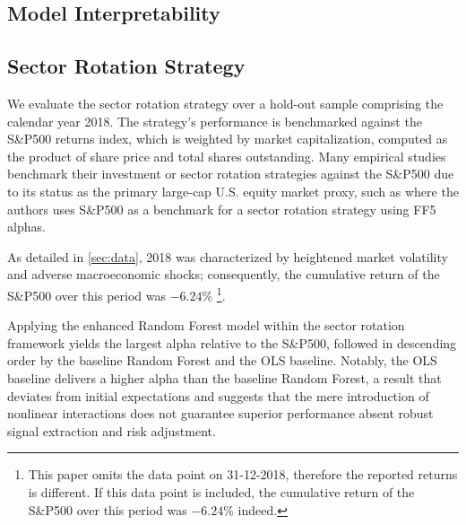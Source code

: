 \subsection{Model Interpretability}
\subsection{Sector Rotation Strategy}

We evaluate the sector rotation strategy over a hold-out sample comprising the calendar year 2018. The strategy's performance is benchmarked against the S\&P500 returns index, which is weighted by market capitalization, computed as the product of share price and total shares outstanding. Many empirical studies benchmark their investment or sector rotation strategies against the S\&P500 due to its status as the primary large-cap U.S. equity market proxy, such as  where the authors uses S\&P500 as a benchmark for a sector rotation strategy using FF5 alphas. 


As detailed in \cref{sec:data}, 2018 was characterized by heightened market volatility and adverse macroeconomic shocks; consequently, the cumulative return of the S\&P500 over this period was $-6.24\%$ \footnote{This paper omits the data point on 31-12-2018, therefore the reported returns is different. If this data point is included, the cumulative return of the S\&P500 over this period was $-6.24\%$ indeed.}.

Applying the enhanced Random Forest model within the sector rotation framework yields the largest alpha relative to the S\&P500, followed in descending order by the baseline Random Forest and the OLS baseline. Notably, the OLS baseline delivers a higher alpha than the baseline Random Forest, a result that deviates from initial expectations and suggests that the mere introduction of nonlinear interactions does not guarantee superior performance absent robust signal extraction and risk adjustment.

